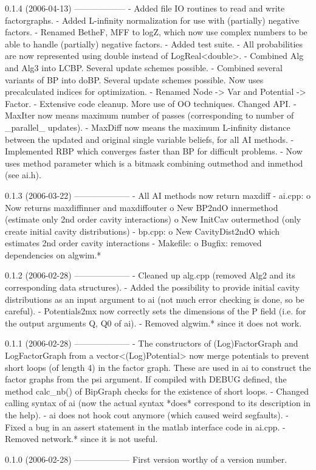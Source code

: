\begin{DoxyVerbInclude}
0.1.4 (2006-04-13)
------------------
- Added file IO routines to read and write factorgraphs.
- Added L-infinity normalization for use with (partially) negative factors.
- Renamed BetheF, MFF to logZ, which now use complex numbers to be able to
handle (partially) negative factors.
- Added test suite.
- All probabilities are now represented using double instead of LogReal<double>.
- Combined Alg and Alg3 into LCBP. Several update schemes possible.
- Combined several variants of BP into doBP. Several update schemes possible.
Now uses precalculated indices for optimization.
- Renamed Node -> Var and Potential -> Factor.
- Extensive code cleanup. More use of OO techniques. Changed API.
- MaxIter now means maximum number of passes (corresponding to number of
_parallel_ updates).
- MaxDiff now means the maximum L-infinity distance between the updated and
original single variable beliefs, for all AI methods.
- Implemented RBP which converges faster than BP for difficult problems.
- Now uses method parameter which is a bitmask combining outmethod and inmethod
(see ai.h).


0.1.3   (2006-03-22)
--------------------
- All AI methods now return maxdiff
- ai.cpp:
    o Now returns maxdiffinner and maxdiffouter
    o New BP2ndO innermethod (estimate only 2nd order cavity interactions)
    o New InitCav outermethod (only create initial cavity distributions)
- bp.cpp:
    o New CavityDist2ndO which estimates 2nd order cavity interactions
- Makefile:
    o Bugfix: removed dependencies on algwim.*


0.1.2   (2006-02-28)
--------------------
- Cleaned up alg.cpp (removed Alg2 and its corresponding data structures).
- Added the possibility to provide initial cavity distributions as an input
argument to ai (not much error checking is done, so be careful).
- Potentials2mx now correctly sets the dimensions of the P field (i.e. for
the output arguments Q, Q0 of ai).
- Removed algwim.* since it does not work.


0.1.1   (2006-02-28)
--------------------
- The constructors of (Log)FactorGraph and LogFactorGraph from a
vector<(Log)Potential> now merge potentials to prevent short loops (of length
4) in the factor graph. These are used in ai to construct the factor graphs
from the psi argument. If compiled with DEBUG defined, the method calc_nb()
of BipGraph checks for the existence of short loops.
- Changed calling syntax of ai (now the actual syntax *does* correspond to its
description in the help).
- ai does not hook cout anymore (which caused weird segfaults).
- Fixed a bug in an assert statement in the matlab interface code in ai.cpp.
- Removed network.* since it is not useful.


0.1.0   (2006-02-28)
--------------------
First version worthy of a version number.
\end{DoxyVerbInclude}
 
